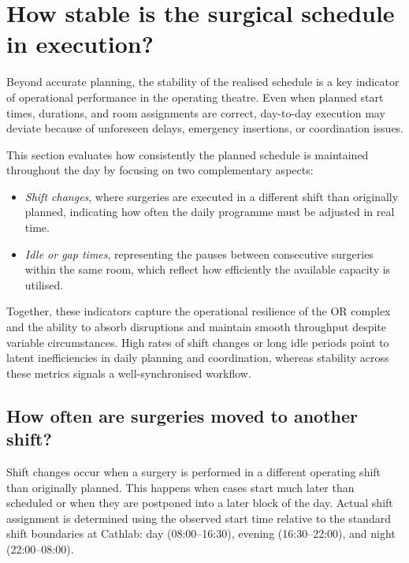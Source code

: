 \documentclass[
]{article}
\providecommand{\tightlist}{%
  \setlength{\itemsep}{0pt}\setlength{\parskip}{0pt}}
\begin{document}
\newpage

\section{How stable is the surgical schedule in
execution?}\label{how-stable-is-the-surgical-schedule-in-execution}

Beyond accurate planning, the stability of the realised schedule is a
key indicator of operational performance in the operating theatre. Even
when planned start times, durations, and room assignments are correct,
day-to-day execution may deviate because of unforeseen delays, emergency
insertions, or coordination issues.

This section evaluates how consistently the planned schedule is
maintained throughout the day by focusing on two complementary aspects:

\begin{itemize}
\tightlist
\item
  \emph{Shift changes}, where surgeries are executed in a different
  shift than originally planned, indicating how often the daily
  programme must be adjusted in real time.
\item
  \emph{Idle or gap times}, representing the pauses between consecutive
  surgeries within the same room, which reflect how efficiently the
  available capacity is utilised.
\end{itemize}

Together, these indicators capture the operational resilience of the OR
complex and the ability to absorb disruptions and maintain smooth
throughput despite variable circumstances. High rates of shift changes
or long idle periods point to latent inefficiencies in daily planning
and coordination, whereas stability across these metrics signals a
well-synchronised workflow.

\subsection{How often are surgeries moved to another
shift?}\label{how-often-are-surgeries-moved-to-another-shift}

Shift changes occur when a surgery is performed in a different operating
shift than originally planned. This happens when cases start much later
than scheduled or when they are postponed into a later block of the day.
Actual shift assignment is determined using the observed start time
relative to the standard shift boundaries at Cathlab: day
(08:00--16:30), evening (16:30--22:00), and night (22:00--08:00).
\end{document}
